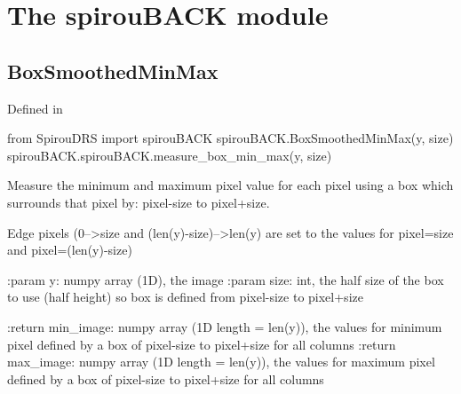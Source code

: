 
\clearpage
\newpage
\begin{minipage}{\textwidth}
\section{The spirouBACK module}
\label{ch:the_module:spirouBACK}


\subsection{BoxSmoothedMinMax}
Defined in \spirouBACK{}
\begin{pythonbox}
from SpirouDRS import spirouBACK
spirouBACK.BoxSmoothedMinMax(y, size)
spirouBACK.spirouBACK.measure_box_min_max(y, size)
\end{pythonbox}
\begin{pythondocstring}
Measure the minimum and maximum pixel value for each pixel using a box which
surrounds that pixel by:  pixel-size to pixel+size.

Edge pixels (0-->size and (len(y)-size)-->len(y) are
set to the values for pixel=size and pixel=(len(y)-size)

:param y: numpy array (1D), the image
:param size: int, the half size of the box to use (half height)
             so box is defined from  pixel-size to pixel+size

:return min_image: numpy array (1D length = len(y)), the values
                   for minimum pixel defined by a box of pixel-size to
                   pixel+size for all columns
:return max_image: numpy array (1D length = len(y)), the values
                   for maximum pixel defined by a box of pixel-size to
                   pixel+size for all columns
\end{pythondocstring}
\end{minipage}


